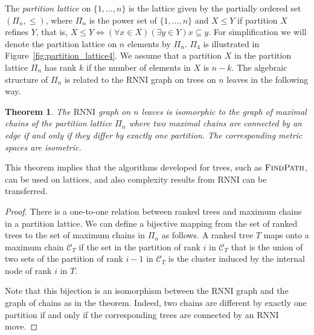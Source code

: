 \documentclass[11pt]{amsart}
\newtheorem{theorem}{Theorem}
\newcommand{\rnni}{\mathrm{RNNI}}
\newcommand{\findpath}{\textsc{FindPath}}
\begin{document}
The \emph{partition lattice} on $\{1, \ldots, n\}$ is the lattice given by the partially ordered set $(\Pi_n, \leq)$, where $\Pi_n$ is the power set of $\{1, \ldots, n\}$ and $X \leq Y$ if partition $X$ refines $Y$, that is, $X \leq Y \Leftrightarrow (\forall x \in X)(\exists y \in Y) x \subseteq y$.
For simplification we will denote the partition lattice on $n$ elements by $\Pi_n$.
$\Pi_4$ is illustrated in Figure~\ref{fig:partition_lattice4}.
We assume that a partition $X$ in the partition lattice $\Pi_n$ has rank $k$ if the number of elements in $X$ is $n-k$.
The algebraic structure of $\Pi_n$ is related to the $\rnni$ graph on trees on $n$ leaves in the following way.


\begin{theorem}
The $\rnni$ graph on $n$ leaves is isomorphic to the graph of maximal chains of the partition lattice $\Pi_n$ where two maximal chains are connected by an edge if and only if they differ by exactly one partition.
The corresponding metric spaces are isometric.
\label{thm:partition_lattice}
\end{theorem}

This theorem implies that the algorithms developed for trees, such as $\findpath$, can be used on lattices, and also complexity results from $\rnni$ can be transferred.

\begin{proof}
There is a one-to-one relation between ranked trees and maximum chains in a partition lattice.
We can define a bijective mapping from the set of ranked trees to the set of maximum chains in $\Pi_n$ as follows.
A ranked tree $T$ maps onto a maximum chain $\mathcal{C}_T$ if the set in the partition of rank $i$ in $\mathcal{C}_T$ that is the union of two sets of the partition of rank $i-1$ in $\mathcal{C}_T$ is the cluster induced by the internal node of rank $i$ in $T$.

Note that this bijection is an isomorphism between the $\rnni$ graph and the graph of chains as in the theorem.
Indeed, two chains are different by exactly one partition if and only if the corresponding trees are connected by an $\rnni$ move.
\end{proof}
\end{document}

